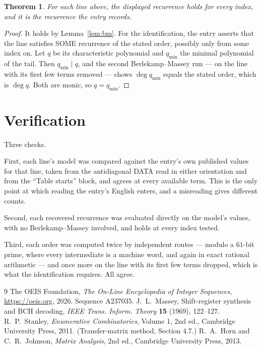 \documentclass[11pt,a4paper]{article}
\theoremstyle{plain}
\newtheorem{theorem}{Theorem}
\theoremstyle{definition}
\begin{document}
\begin{theorem}
For each line above, the displayed recurrence holds for every index, and it is the recurrence
the entry records.
\end{theorem}

\begin{proof}
It holds by Lemma~\ref{lem:bm}. For the identification, the entry asserts that the line
satisfies SOME recurrence of the stated order, possibly only from some index on. Let $q$ be its
characteristic polynomial and $q_{\min}$ the minimal polynomial of the tail. Then
$q_{\min}\mid q$, and the second Berlekamp--Massey run --- on the line with its first few
terms removed --- shows $\deg q_{\min}$ equals the stated order, which is $\deg q$. Both are
monic, so $q=q_{\min}$.
\end{proof}

\section{Verification}

Three checks.

First, each line's model was compared against the entry's own published values for that line,
taken from the antidiagonal DATA read in either orientation and from the ``Table starts''
block, and agrees at every available term. This is the only point at which reading the entry's
English enters, and a misreading gives different counts.

Second, each recovered recurrence was evaluated directly on the model's values, with no
Berlekamp--Massey involved, and holds at every index tested.

Third, each order was computed twice by independent routes --- modulo a $61$-bit prime, where
every intermediate is a machine word, and again in exact rational arithmetic --- and once more
on the line with its first few terms dropped, which is what the identification requires. All
agree.

\begin{thebibliography}{9}
 The OEIS Foundation, \emph{The On-Line Encyclopedia of Integer
Sequences}, \url{https://oeis.org}, 2026. Sequence A237035.
 J.~L.~Massey, Shift-register synthesis and BCH decoding, \emph{IEEE
Trans. Inform. Theory} \textbf{15} (1969), 122--127.
 R.~P.~Stanley, \emph{Enumerative Combinatorics}, Volume 1, 2nd ed.,
Cambridge University Press, 2011. (Transfer-matrix method, Section 4.7.)
 R.~A.~Horn and C.~R.~Johnson, \emph{Matrix Analysis}, 2nd ed., Cambridge
University Press, 2013.
\end{thebibliography}
\end{document}
